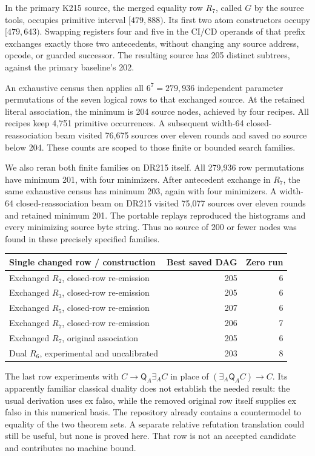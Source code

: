 \documentclass[11pt,a4paper]{article}
\theoremstyle{definition}
\newcommand{\qnt}{\mathsf Q}
\numberwithin{equation}{section}
\begin{document}
In the primary K215 source, the merged equality row $R_7$, called $G$
by the source tools, occupies primitive interval $[479,888)$. Its first
two atom constructors occupy $[479,643)$. Swapping registers four and
five in the CI/CD operands of that prefix exchanges exactly those two
antecedents, without changing any source address, opcode, or guarded
successor. The resulting source has 205 distinct subtrees, against
the primary baseline's 202.

An exhaustive census then applies all $6^7=279{,}936$ independent
parameter permutations of the seven logical rows to that exchanged
source. At the retained literal association, the minimum is 204 source
nodes, achieved by four recipes. All recipes keep 4,751 primitive
occurrences. A subsequent width-64 closed-reassociation beam visited
76,675 sources over eleven rounds and saved no source below 204.
These counts are scoped to those finite or bounded search families.

We also reran both finite families on DR215 itself. All 279,936 row
permutations have minimum 201, with four minimizers. After antecedent
exchange in $R_7$, the same exhaustive census has minimum 203, again
with four minimizers. A width-64 closed-reassociation beam on DR215
visited 75,077 sources over eleven rounds and retained minimum 201.
The portable replays reproduced the histograms and every minimizing
source byte string. Thus no source of 200 or fewer nodes was found in
these precisely specified families.

\begin{center}
\begin{tabular}{lrr}
\toprule
Single changed row / construction & Best saved DAG & Zero run\\
\midrule
Exchanged $R_2$, closed-row re-emission & 205 & 6\\
Exchanged $R_3$, closed-row re-emission & 205 & 6\\
Exchanged $R_5$, closed-row re-emission & 207 & 6\\
Exchanged $R_7$, closed-row re-emission & 206 & 7\\
Exchanged $R_7$, original association & 205 & 6\\
Dual $R_6$, experimental and uncalibrated & 203 & 8\\
\bottomrule
\end{tabular}
\end{center}

The last row experiments with $C\to\qnt_A\exists_A C$ in place of
$(\exists_A\qnt_A C)\to C$. Its apparently familiar classical duality
does not establish the needed result: the usual derivation uses ex falso,
while the removed original row itself supplies ex falso in this numerical
basis. The repository already contains a countermodel to equality of the
two theorem sets. A separate relative refutation translation could still
be useful, but none is proved here. That row is not an accepted candidate
and contributes no machine bound.
\end{document}
